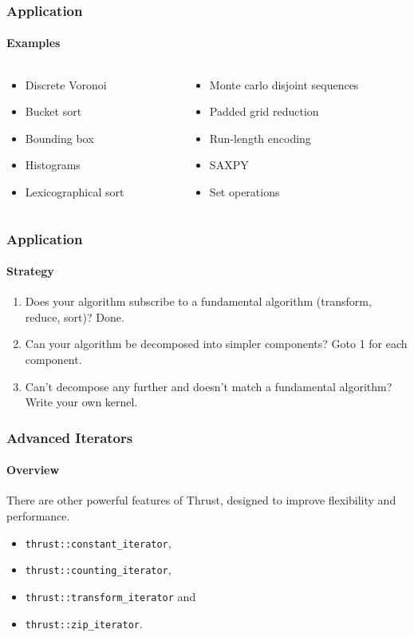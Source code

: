 \begin{frame}
  \frametitle{Application}
  \framesubtitle{Examples}
  \begin{example}
    \begin{columns}
      \begin{column}{.4\textwidth}
        \begin{itemize}
        \item Discrete Voronoi
        \item Bucket sort
        \item Bounding box
        \item Histograms
        \item Lexicographical sort
        \end{itemize}
      \end{column}
      \begin{column}{.5\textwidth}
        \begin{itemize}
        \item Monte carlo disjoint sequences
        \item Padded grid reduction
        \item Run-length encoding
        \item SAXPY
        \item Set operations
        \end{itemize}
      \end{column}
    \end{columns}
  \end{example}
\end{frame}

\begin{frame}
  \frametitle{Application}
  \framesubtitle{Strategy}
  \begin{enumerate}
  \item Does your algorithm subscribe to a fundamental algorithm (transform, reduce, sort)? Done.
  \pause
  \item Can your algorithm be decomposed into simpler components? Goto 1 for each component.
  \pause
  \item Can't decompose any further and doesn't match a fundamental algorithm? Write your own kernel.
  \end{enumerate}
\end{frame}

\begin{frame}[fragile]
  \frametitle{Advanced Iterators}
  \framesubtitle{Overview}
  There are other powerful features of Thrust, designed to improve
  flexibility and performance.
  \begin{itemize}
  \item \lstinline|thrust::constant_iterator|,
  \item \lstinline|thrust::counting_iterator|,
  \item \lstinline|thrust::transform_iterator| and
  \item \lstinline|thrust::zip_iterator|.
  \end{itemize}
\end{frame}
